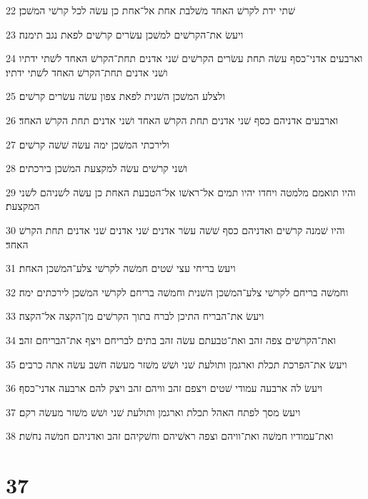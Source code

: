 \par 22 שׁתי ידת לקרשׁ האחד משׁלבת אחת אל־אחת כן עשׂה לכל קרשׁי המשׁכן׃
\par 23 ויעשׂ את־הקרשׁים למשׁכן עשׂרים קרשׁים לפאת נגב תימנה׃
\par 24 וארבעים אדני־כסף עשׂה תחת עשׂרים הקרשׁים שׁני אדנים תחת־הקרשׁ האחד לשׁתי ידתיו ושׁני אדנים תחת־הקרשׁ האחד לשׁתי ידתיו׃
\par 25 ולצלע המשׁכן השׁנית לפאת צפון עשׂה עשׂרים קרשׁים׃
\par 26 וארבעים אדניהם כסף שׁני אדנים תחת הקרשׁ האחד ושׁני אדנים תחת הקרשׁ האחד׃
\par 27 ולירכתי המשׁכן ימה עשׂה שׁשׁה קרשׁים׃
\par 28 ושׁני קרשׁים עשׂה למקצעת המשׁכן בירכתים׃
\par 29 והיו תואמם מלמטה ויחדו יהיו תמים אל־ראשׁו אל־הטבעת האחת כן עשׂה לשׁניהם לשׁני המקצעת׃
\par 30 והיו שׁמנה קרשׁים ואדניהם כסף שׁשׁה עשׂר אדנים שׁני אדנים שׁני אדנים תחת הקרשׁ האחד׃
\par 31 ויעשׂ בריחי עצי שׁטים חמשׁה לקרשׁי צלע־המשׁכן האחת׃
\par 32 וחמשׁה בריחם לקרשׁי צלע־המשׁכן השׁנית וחמשׁה בריחם לקרשׁי המשׁכן לירכתים ימה׃
\par 33 ויעשׂ את־הבריח התיכן לברח בתוך הקרשׁים מן־הקצה אל־הקצה׃
\par 34 ואת־הקרשׁים צפה זהב ואת־טבעתם עשׂה זהב בתים לבריחם ויצף את־הבריחם זהב׃
\par 35 ויעשׂ את־הפרכת תכלת וארגמן ותולעת שׁני ושׁשׁ משׁזר מעשׂה חשׁב עשׂה אתה כרבים׃
\par 36 ויעשׂ לה ארבעה עמודי שׁטים ויצפם זהב וויהם זהב ויצק להם ארבעה אדני־כסף׃
\par 37 ויעשׂ מסך לפתח האהל תכלת וארגמן ותולעת שׁני ושׁשׁ משׁזר מעשׂה רקם׃
\par 38 ואת־עמודיו חמשׁה ואת־וויהם וצפה ראשׁיהם וחשׁקיהם זהב ואדניהם חמשׁה נחשׁת׃

\chapter{37}

